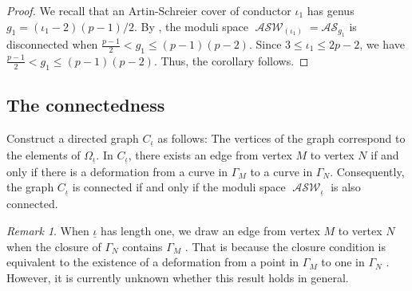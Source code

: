\documentclass{compositio}
\theoremstyle{remark}
\theoremstyle{remark}
\newtheorem{remark}[theorem]{Remark}
\DeclareMathOperator{\ASW}{\mathcal{ASW}}
\begin{document}
\begin{proof}
We recall that an Artin-Schreier cover of conductor $\iota_1$ has genus $g_1 = (\iota_1-2)(p-1)/2$. By \cite[Theorem 1.3]{2020arXiv200203719D}, the moduli space $\ASW_{(\iota_1)} = \mathcal{AS}_{g_1}$ is disconnected when $\frac{p-1}{2} < g_1 \leq (p-1)(p-2)$. Since $3 \leq \iota_1 \leq 2p-2$, we have $\frac{p-1}{2} < g_1 \leq (p-1)(p-2)$. Thus, the corollary follows.
\end{proof}

\subsection{The connectedness}
Construct a directed graph $C_{\underline{\iota}}$ as follows: The vertices of the graph correspond to the elements of $\Omega_{\underline{\iota}}$. In $C_{\underline{\iota}}$, there exists an edge from vertex $M$ to vertex $N$ if and only if there is a deformation from a curve in $\Gamma_M$ to a curve in $\Gamma_N$. Consequently, the graph $C_{\underline{\iota}}$ is connected if and only if the moduli space $\ASW_{\underline{\iota}}$ is also connected.

\begin{remark}
When $\underline{\iota}$ has length one, we draw an edge from vertex $M$ to vertex $N$ when the closure of $\Gamma_N$ contains $\Gamma_M$ \cite[\S 3.2]{DANG2020398}. That is because the closure condition is equivalent to the existence of a deformation from a point in $\Gamma_M$ to one in $\Gamma_N$ \cite[Corollary 3.6]{DANG2020398}. However, it is currently unknown whether this result holds in general.
\end{remark}
\end{document}

